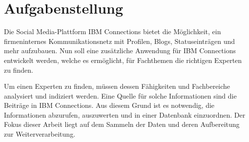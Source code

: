 
\chapter{Aufgabenstellung}
\large
Die Social Media-Plattform IBM Connections bietet die Möglichkeit, ein firmeninternes Kommunikationsnetz mit Profilen, Blogs, Statuseinträgen und mehr aufzubauen. Nun soll eine zusätzliche Anwendung für IBM Connections entwickelt werden, welche es ermöglicht, für Fachthemen die richtigen Experten zu finden.

Um einen Experten zu finden, müssen dessen Fähigkeiten und Fachbereiche analysiert und indiziert werden. Eine Quelle für solche Informationen sind die Beiträge in IBM Connections. Aus diesem Grund ist es notwendig, die Informationen abzurufen, auszuwerten und in einer Datenbank einzuordnen. Der Fokus dieser Arbeit liegt auf dem Sammeln der Daten und deren Aufbereitung zur Weiterverarbeitung.
\newpage